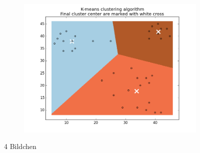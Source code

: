 \documentclass[a4paper,parskip=full-]{article}
\begin{document}
\begin{figure}
\begin{subfigure}[b]{\linewidth}
\end{subfigure}
\qquad
\begin{subfigure}[b]{\linewidth}
\includegraphics[scale=0.5]{3cRND4}
\end{subfigure}
\caption{4 Bildchen}
\end{figure}
\end{document}
